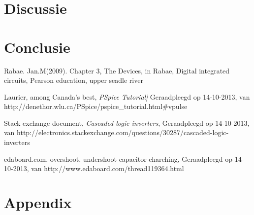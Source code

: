 \documentclass{report}
\begin{document}
\chapter {Discussie}
%

\chapter{Conclusie}
%

\begin{thebibliography}{La}
%
Rabae. Jan.M(2009). Chapter 3, The Devices, in Rabae, Digital integrated circuits, Pearson education, upper seadle river

Laurier, among Canada's best, \textit{PSpice Tutorial|} Geraadpleegd op 14-10-2013, van http://denethor.wlu.ca/PSpice/pspice_tutorial.html#vpulse

Stack exchange document, \textit{Cascaded logic inverters}, Geraadpleegd op 14-10-2013, van http://electronics.stackexchange.com/questions/30287/cascaded-logic-inverters

edaboard.com, overshoot, undershoot capacitor charching, Geraadpleegd op 14-10-2013, van http://www.edaboard.com/thread119364.html

 
\end{thebibliography}


\chapter{Appendix}
\end{document}
